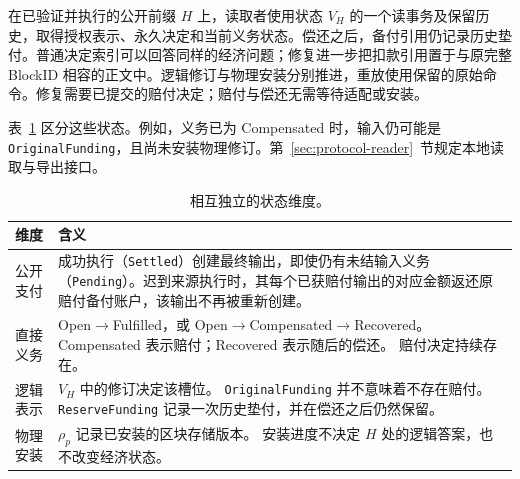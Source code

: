 在已验证并执行的公开前缀 $H$ 上，读取者使用状态 $V_H$ 的一个读事务及保留历史，取得授权表示、永久决定和当前义务状态。偿还之后，备付引用仍记录历史垫付。普通决定索引可以回答同样的经济问题；修复进一步把扣款引用置于与原完整 BlockID 相容的正文中。逻辑修订与物理安装分别推进，重放使用保留的原始命令。修复需要已提交的赔付决定；赔付与偿还无需等待适配或安装。

表~\ref{tab:model-states} 区分这些状态。例如，义务已为 Compensated 时，输入仍可能是 \texttt{OriginalFunding}，且尚未安装物理修订。第~\ref{sec:protocol-reader}~节规定本地读取与导出接口。


\begin{table}[!t]
\caption{相互独立的状态维度。}
\label{tab:model-states}
\centering\small
\setlength{\tabcolsep}{3pt}
\begin{tabular}{@{}p{}p{}@{}}
\toprule
维度 & 含义 \\
\midrule
公开支付 &
成功执行（\texttt{Settled}）创建最终输出，即使仍有未结输入义务（\texttt{Pending}）。迟到来源执行时，其每个已获赔付输出的对应金额返还原赔付备付账户，该输出不再被重新创建。 \\

直接义务 &
Open$\to$Fulfilled，或 Open$\to$Compensated$\to$Recovered。
Compensated 表示赔付；Recovered 表示随后的偿还。
赔付决定持续存在。 \\

逻辑表示 &
$V_H$ 中的修订决定该槽位。
\texttt{OriginalFunding} 并不意味着不存在赔付。
\texttt{ReserveFunding} 记录一次历史垫付，并在偿还之后仍然保留。 \\

物理安装 &
$\rho_p$ 记录已安装的区块存储版本。
安装进度不决定 $H$ 处的逻辑答案，也不改变经济状态。 \\
\bottomrule
\end{tabular}
\end{table}

